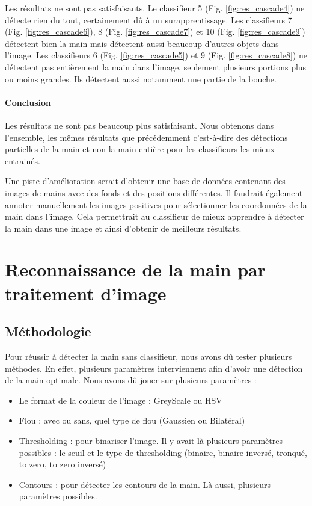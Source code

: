 \documentclass[11pt]{article}
\begin{document}
Les résultats ne sont pas satisfaisants. Le classifieur 5 (Fig. \ref{fig:res_cascade4}) ne détecte rien du tout, certainement dû à un surapprentissage. Les classifieurs 7 (Fig. \ref{fig:res_cascade6}), 8 (Fig. \ref{fig:res_cascade7}) et 10 (Fig. \ref{fig:res_cascade9}) détectent bien la main mais détectent aussi beaucoup d'autres objets dans l'image. Les classifieurs 6 (Fig. \ref{fig:res_cascade5}) et 9 (Fig. \ref{fig:res_cascade8}) ne détectent pas entièrement la main dans l'image, seulement plusieurs portions plus ou moins grandes. Ils détectent aussi notamment une partie de la bouche. 

\paragraph{Conclusion}
Les résultats ne sont pas beaucoup plus satisfaisant. Nous obtenons dans l'ensemble, les mêmes résultats que précédemment c'est-à-dire des détections partielles de la main et non la main entière pour les classifieurs les mieux entrainés.

Une piste d'amélioration serait d'obtenir une base de données contenant des images de mains avec des fonds et des positions différentes.
Il faudrait également annoter manuellement les images positives pour sélectionner les coordonnées de la main dans l'image. Cela permettrait au classifieur de mieux apprendre à détecter la main dans une image et ainsi d'obtenir de meilleurs résultats.

\section{Reconnaissance de la main par traitement d'image}
\subsection{Méthodologie}
Pour réussir à détecter la main sans classifieur, nous avons dû tester plusieurs méthodes. En effet, plusieurs paramètres interviennent afin d'avoir une détection de la main optimale.
Nous avons dû jouer sur plusieurs paramètres :
\begin{itemize}[label=-]
    \item Le format de la couleur de l'image : GreyScale ou HSV
    \item Flou : avec ou sans, quel type de flou (Gaussien ou Bilatéral)
    \item Thresholding : pour binariser l'image. Il y avait là plusieurs paramètres possibles : le seuil et le type de thresholding (binaire, binaire inversé, tronqué, to zero, to zero inversé)
    \item Contours : pour détecter les contours de la main. Là aussi, plusieurs paramètres possibles.
\end{itemize}
\end{document}

